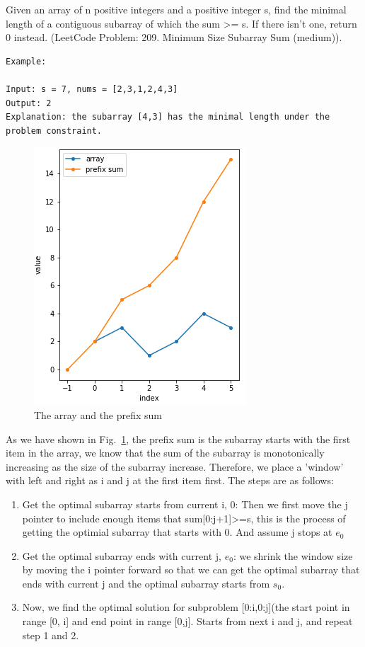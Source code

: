 \documentclass[../searching.tex]{subfiles}
\begin{document}
Given an array of n positive integers and a positive integer s, find the minimal length of a contiguous subarray of which the sum >= s. If there isn't one, return 0 instead. (LeetCode Problem: 209. Minimum Size Subarray Sum (medium)). 
\begin{lstlisting}[numbers=none]
Example: 

Input: s = 7, nums = [2,3,1,2,4,3]
Output: 2
Explanation: the subarray [4,3] has the minimal length under the problem constraint.
\end{lstlisting}
\begin{figure}[h!]
    \centering
    \includegraphics[width=0.5\columnwidth]{fig/prefixsum.png}
    \caption{The array and the prefix sum}
    \label{fig:prefix_sum_array}
\end{figure}
As we have shown in Fig.~\ref{fig:prefix_sum_array}, the prefix sum is the subarray starts with the first item in the array, we know that the sum of the subarray is monotonically increasing as the size of the subarray increase. Therefore, we place a 'window' with left and right as i and j at the first item first. The steps are as follows:
\begin{enumerate}
    \item Get the optimal subarray starts from current i, 0: Then we first move the j pointer to include enough items that sum[0:j+1]>=s, this is the process of getting the optimial subarray that starts with 0. And assume j stops at $e_0$
    \item Get the optimal subarray ends with current j, $e_0$: we shrink the window size by moving the i pointer forward so that we can get the optimal subarray that ends with current j and the optimal subarray starts from $s_0$. 
    \item Now, we find the optimal solution for subproblem [0:i,0:j](the start point in range [0, i] and end point in range [0,j]. Starts from next i and j, and repeat step 1 and 2.
\end{enumerate}
\end{document}
